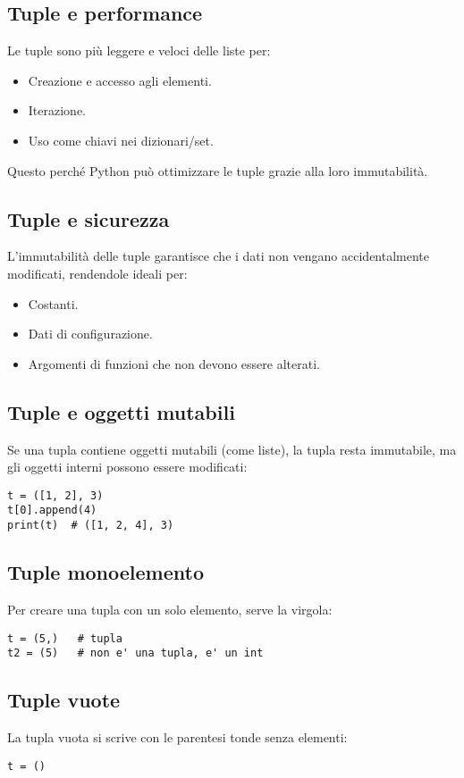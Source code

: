 \documentclass[a4paper,12pt]{article}
\begin{document}
\subsection*{Tuple e performance}
Le tuple sono più leggere e veloci delle liste per:
\begin{itemize}
    \item Creazione e accesso agli elementi.
    \item Iterazione.
    \item Uso come chiavi nei dizionari/set.
\end{itemize}
Questo perché Python può ottimizzare le tuple grazie alla loro immutabilità.

\subsection*{Tuple e sicurezza}
L'immutabilità delle tuple garantisce che i dati non vengano accidentalmente modificati, rendendole ideali per:
\begin{itemize}
    \item Costanti.
    \item Dati di configurazione.
    \item Argomenti di funzioni che non devono essere alterati.
\end{itemize}

\subsection*{Tuple e oggetti mutabili}
Se una tupla contiene oggetti mutabili (come liste), la tupla resta immutabile, ma gli oggetti interni possono essere modificati:
\begin{lstlisting}
t = ([1, 2], 3)
t[0].append(4)
print(t)  # ([1, 2, 4], 3)
\end{lstlisting}

\subsection*{Tuple monoelemento}
Per creare una tupla con un solo elemento, serve la virgola:
\begin{lstlisting}
t = (5,)   # tupla
t2 = (5)   # non e' una tupla, e' un int
\end{lstlisting}

\subsection*{Tuple vuote}
La tupla vuota si scrive con le parentesi tonde senza elementi:
\begin{lstlisting}
t = ()
\end{lstlisting}
\end{document}
